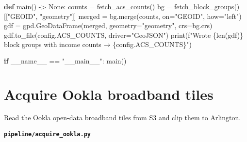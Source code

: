 \documentclass[
  letterpaper,
  DIV=11,
  numbers=noendperiod]{scrreprt}
\newenvironment{Shaded}{\begin{snugshade}}{\end{snugshade}}
\newcommand{\BuiltInTok}[1]{\textcolor[rgb]{0.00,0.23,0.31}{#1}}
\newcommand{\ControlFlowTok}[1]{\textcolor[rgb]{0.00,0.23,0.31}{\textbf{#1}}}
\newcommand{\KeywordTok}[1]{\textcolor[rgb]{0.00,0.23,0.31}{\textbf{#1}}}
\newcommand{\NormalTok}[1]{\textcolor[rgb]{0.00,0.23,0.31}{#1}}
\newcommand{\OperatorTok}[1]{\textcolor[rgb]{0.37,0.37,0.37}{#1}}
\newcommand{\SpecialCharTok}[1]{\textcolor[rgb]{0.37,0.37,0.37}{#1}}
\newcommand{\SpecialStringTok}[1]{\textcolor[rgb]{0.13,0.47,0.30}{#1}}
\newcommand{\StringTok}[1]{\textcolor[rgb]{0.13,0.47,0.30}{#1}}
\newcommand{\VariableTok}[1]{\textcolor[rgb]{0.07,0.07,0.07}{#1}}
\begin{document}
\begin{Shaded}
\begin{Highlighting}[]
\KeywordTok{def}\NormalTok{ main() }\OperatorTok{{-}\textgreater{}} \VariableTok{None}\NormalTok{:}
\NormalTok{    counts }\OperatorTok{=}\NormalTok{ fetch\_acs\_counts()}
\NormalTok{    bg }\OperatorTok{=}\NormalTok{ fetch\_block\_groups()[[}\StringTok{"GEOID"}\NormalTok{, }\StringTok{"geometry"}\NormalTok{]]}
\NormalTok{    merged }\OperatorTok{=}\NormalTok{ bg.merge(counts, on}\OperatorTok{=}\StringTok{"GEOID"}\NormalTok{, how}\OperatorTok{=}\StringTok{"left"}\NormalTok{)}
\NormalTok{    gdf }\OperatorTok{=}\NormalTok{ gpd.GeoDataFrame(merged, geometry}\OperatorTok{=}\StringTok{"geometry"}\NormalTok{, crs}\OperatorTok{=}\NormalTok{bg.crs)}
\NormalTok{    gdf.to\_file(config.ACS\_COUNTS, driver}\OperatorTok{=}\StringTok{"GeoJSON"}\NormalTok{)}
    \BuiltInTok{print}\NormalTok{(}\SpecialStringTok{f"Wrote }\SpecialCharTok{\{}\BuiltInTok{len}\NormalTok{(gdf)}\SpecialCharTok{\}}\SpecialStringTok{ block groups with income counts → }\SpecialCharTok{\{}\NormalTok{config}\SpecialCharTok{.}\NormalTok{ACS\_COUNTS}\SpecialCharTok{\}}\SpecialStringTok{"}\NormalTok{)}


\ControlFlowTok{if} \VariableTok{\_\_name\_\_} \OperatorTok{==} \StringTok{"\_\_main\_\_"}\NormalTok{:}
\NormalTok{    main()}
\end{Highlighting}
\end{Shaded}

\section{Acquire Ookla broadband
tiles}\label{acquire-ookla-broadband-tiles}

Read the Ookla open-data broadband tiles from S3 and clip them to
Arlington.

\textbf{\texttt{pipeline/acquire\_ookla.py}}
\end{document}
